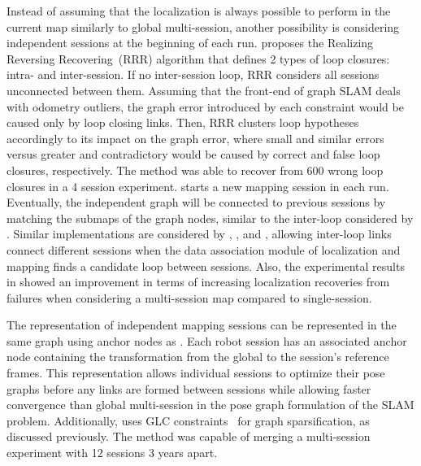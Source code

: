 Instead of assuming that the localization is always possible to perform in the current map similarly to global multi-session, another possibility is considering independent sessions at the beginning of each run.
\cite{latif-et-al:2012:6385879} proposes the Realizing Reversing Recovering~(RRR) algorithm that defines 2 types of loop closures: intra- and inter-session. If no inter-session loop, RRR considers all sessions unconnected between them. Assuming that the front-end of graph SLAM deals with odometry outliers, the graph error introduced by each constraint would be caused only by loop closing links. Then, RRR clusters loop hypotheses accordingly to its impact on the graph error, where small and similar errors versus greater and contradictory would be caused by correct and false loop closures, respectively. The method was able to recover from 600 wrong loop closures in a 4 session experiment.
\cite{oberländer-et-al:2013:6766479} starts a new mapping session in each run. Eventually, the independent graph will be connected to previous sessions by matching the submaps of the graph nodes, similar to the inter-loop considered by \cite{latif-et-al:2012:6385879}.
Similar implementations are considered by \cite{mühlfellner-et-al:2016:21595}, \cite{lázaro-et-al:2018:8594310}, and \cite{labbé-michaud:2019:21831}, allowing inter-loop links connect different sessions when the data association module of localization and mapping finds a candidate loop between sessions. Also, the experimental results in \cite{mühlfellner-et-al:2016:21595} showed an improvement in terms of increasing localization recoveries from failures when considering a multi-session map compared to single-session.

The representation of independent mapping sessions can be represented in the same graph using anchor nodes as \cite{ozog-et-al:2016:21582}.
Each robot session has an associated anchor node containing the transformation from the global to the session's reference frames. This representation allows individual sessions to optimize their pose graphs before any links are formed between sessions while allowing faster convergence than global multi-session in the pose graph formulation of the SLAM problem.
Additionally, \cite{ozog-et-al:2016:21582} uses GLC constraints~\parencite{carlevaris-bianco-et-al:2014:2347571} for graph sparsification, as discussed previously.
The method was capable of merging a multi-session experiment with 12 sessions 3 years apart.






